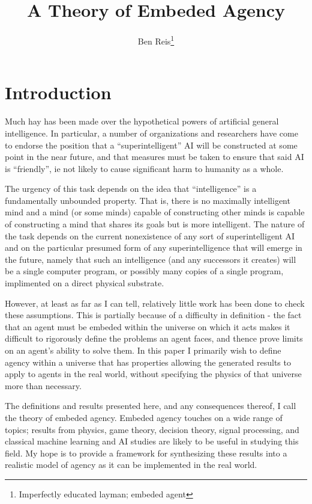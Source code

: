 \documentclass[12pt]{article}
\theoremstyle{definition}
\begin{document}
\title{A Theory of Embeded Agency}
\author{Ben Reis\footnote{Imperfectly educated layman; embeded agent}}
\maketitle

\section{Introduction}
Much hay has been made over the hypothetical powers of artificial general
intelligence. In particular, a number of organizations and researchers have come
to endorse the position that a ``superintelligent'' AI will be constructed at
some point in the near future, and that measures must be taken to ensure that
said AI is ``friendly'', ie not likely to cause significant harm to humanity as
a whole.

The urgency of this task depends on the idea that ``intelligence'' is a
fundamentally unbounded property. That is, there is no maximally intelligent
mind and a mind (or some minds) capable of constructing other minds is capable
of constructing a mind that shares its goals but is more intelligent. The nature
of the task depends on the current nonexistence of any sort of superintelligent
AI and on the particular presumed form of any superintelligence that will emerge
in the future, namely that such an intelligence (and any successors it creates)
will be a single computer program, or possibly many copies of a single program,
implimented on a direct physical substrate.

However, at least as far as I can tell, relatively little work has been done to
check these assumptions. This is partially because of a difficulty in definition
- the fact that an agent must be embeded within the universe on which it acts
makes it difficult to rigorously define the problems an agent faces, and thence
prove limits on an agent's ability to solve them. In this paper I primarily wish
to define agency within a universe that has properties allowing the generated
results to apply to agents in the real world, without specifying the physics of
that universe more than necessary.

The definitions and results presented here, and any consequences thereof, I call
the theory of embeded agency. Embeded agency touches on a wide range of topics;
results from physics, game theory, decision theory, signal processing, and
classical machine learning and AI studies are likely to be useful in studying
this field. My hope is to provide a framework for synthesizing these results
into a realistic model of agency as it can be implemented in the real world.
\end{document}
